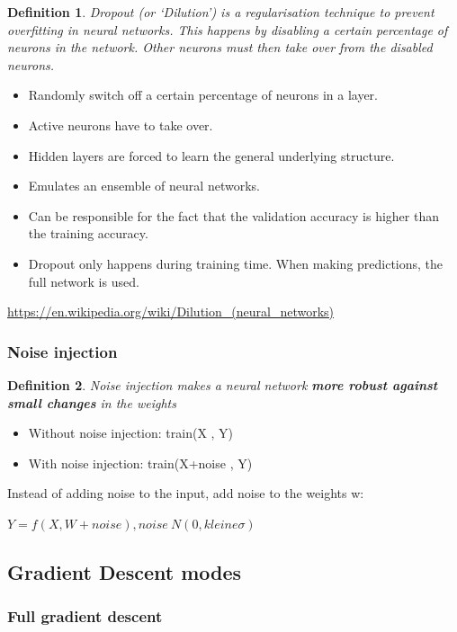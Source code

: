 \documentclass{article}
\newtheorem{theorem}{Definition}[section]
\begin{document}
\begin{theorem}
    Dropout (or `Dilution') is a regularisation technique to prevent overfitting in neural networks.
    This happens by disabling a certain percentage of neurons in the network. Other neurons must then take over from the disabled neurons.
\end{theorem}

\begin{itemize}
    \item Randomly switch off a certain percentage of neurons in a layer.
    \item Active neurons have to take over.
    \item Hidden layers are forced to learn the general underlying structure.
    \item Emulates an ensemble of neural networks.
    \item Can be responsible for the fact that the validation accuracy is higher than the training accuracy.
    \item Dropout only happens during training time. When making predictions, the full network is used.
\end{itemize}

\url{https://en.wikipedia.org/wiki/Dilution_(neural_networks)}

\subsubsection{Noise injection}

\begin{theorem}
    Noise injection makes a neural network \textbf{more robust against small changes} in the weights
\end{theorem}

\begin{itemize}
    \item Without noise injection: train(X , Y)
    \item With noise injection: train(X+noise , Y)
\end{itemize}

Instead of adding noise to the input, add noise to the weights w:

$Y = f (X, W + noise), noise ~ N(0, kleine \sigma)$


\subsection{Gradient Descent modes}

\subsubsection{Full gradient descent}
\end{document}

